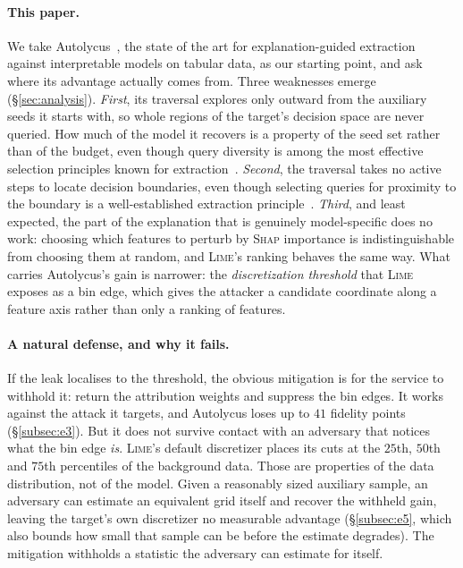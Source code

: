 \documentclass[sigconf,anonymous,review]{acmart}
\begin{document}
\paragraph{This paper.} We take Autolycus~\cite{oksuz2024autolycus}, the state of the art for explanation-guided 
extraction against interpretable models on tabular data, as our starting point,
and ask where its advantage actually comes from. Three weaknesses emerge (\S\ref{sec:analysis}).
\emph{First}, its traversal explores only outward from the auxiliary seeds it starts with, so whole
regions of the target's decision space are never queried. How much of the model it recovers is a
property of the seed set rather than of the budget, even though query diversity is among the most
effective selection principles known for extraction~\cite{pal2020activethief}. \emph{Second}, the traversal takes no active
steps to locate decision boundaries, even though selecting queries for proximity to the boundary is a
well-established extraction principle~\cite{tramer2016stealing,pal2020activethief}. \emph{Third}, and least expected, the
part of the explanation that is genuinely model-specific does no work: choosing which features to
perturb by \textsc{Shap} importance is indistinguishable from choosing them at random, and
\textsc{Lime}'s ranking behaves the same way. What carries Autolycus's gain is narrower: the \emph{discretization threshold} that \textsc{Lime} exposes as a bin edge, which gives the
attacker a candidate coordinate along a feature axis rather than only a ranking of features.

\paragraph{A natural defense, and why it fails.} If the leak localises to the threshold, the obvious
mitigation is for the service to withhold it: return the attribution weights and suppress the bin
edges. It works against the attack it targets, and Autolycus loses up to $41$ fidelity points
(\S\ref{subsec:e3}). But it does not survive contact with an adversary that notices what the bin edge
\emph{is}. \textsc{Lime}'s default discretizer places its cuts at the $25$th, $50$th and $75$th
percentiles of the background data. Those are properties of the data distribution, not of the model.
Given a reasonably sized auxiliary sample, an adversary can estimate an equivalent grid itself and
recover the withheld gain, leaving the target's own discretizer no measurable advantage
(\S\ref{subsec:e5}, which also bounds how small that sample can be before the estimate degrades). The mitigation withholds a statistic the adversary can
estimate for itself.
\end{document}
